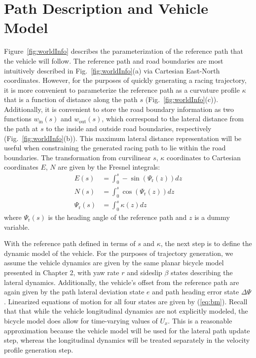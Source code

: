 \section{Path Description and Vehicle Model}
\label{sec:PATH}
Figure~\ref{fig:worldInfo} describes the parameterization of the reference path that the vehicle will follow. The
reference path and road boundaries are most intuitively described in Fig.~\ref{fig:worldInfo}(a) via Cartesian East-North coordinates. However, for the purposes of quickly generating
a racing trajectory, it is more convenient to parameterize the reference path as a curvature profile $\kappa$ that is a function of distance along the path $s$ (Fig.~\ref{fig:worldInfo}(c)). Additionally, it is 
convenient to store the road boundary information as two functions $w_\mathrm{in}(s)$ and $w_\mathrm{out}(s)$, which correspond to the lateral distance from the path at $s$
 to the inside and outside road boundaries, respectively (Fig.~\ref{fig:worldInfo}(b)). This maximum lateral distance representation will be useful when constraining the generated racing path to lie within the road 
 boundaries. The transformation from curvilinear $s$, $\kappa$ coordinates to 
Cartesian coordinates $E$, $N$ are given by the Fresnel integrals:
\begin{subequations}
\label{eq:fresnel}
\begin{align}
	E(s) &= \int_0^s  -\sin(\Psi_\mathrm{r}(z)) dz \\
	N(s) &= \int_0^s   \cos(\Psi_\mathrm{r}(z)) dz \\
	\Psi_\mathrm{r}(s) &= \int_0^s \kappa(z) dz \label{eq:balls}
\end{align}
\end{subequations}
where $\Psi_\mathrm{r}(s)$ is the heading angle of the reference path and $z$ is a dummy variable. 

With the reference path defined in terms of $s$ and $\kappa$, the 
next step is to define the dynamic model of the vehicle. For the purposes of trajectory generation, we assume the vehicle dynamics are given 
by the same planar bicycle model presented in Chapter 2, with 
yaw rate $r$ and sideslip $\beta$ states describing the lateral dynamics. 
Additionally, the vehicle's offset from
the reference path are again given by the path lateral deviation state $e$ and path heading error state $\Delta\Psi$. 
Linearized equations of motion for all four states are given by (\ref{eq:bm}). Recall that that while 
the vehicle longitudinal dynamics are not explicitly modeled, the bicycle model does allow for time-varying values of $U_x$. 
This is a reasonable approximation because the vehicle model will be used for the lateral path update step, 
whereas the longitudinal dynamics will be treated separately in the velocity profile generation step. 

